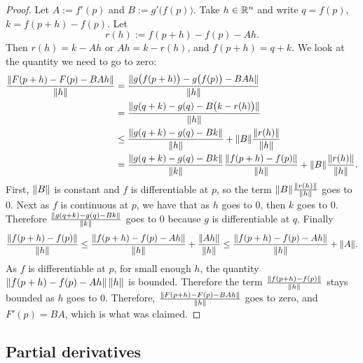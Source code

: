\begin{proof}
Let $A := f'(p)$ and $B := g'\bigl(f(p)\bigr)$.  Take $h \in {\mathbb{R}}^n$
and write $q = f(p)$, $k = f(p+h)-f(p)$.  Let
\begin{equation*}
r(h) := f(p+h)-f(p) - A h . %
\end{equation*}
Then $r(h) = k-Ah$ or $Ah = k-r(h)$, and $f(p+h) = q+k$.
We look at the quantity we need to go
to zero:
\begin{equation*}
\begin{split}
\frac{\lVert {F(p+h)-F(p) - BAh} \rVert}{\lVert {h} \rVert}
& =
\frac{\lVert {g\bigl(f(p+h)\bigr)-g\bigl(f(p)\bigr) - BAh} \rVert}{\lVert {h} \rVert}
\\
& =
\frac{\lVert {g(q+k)-g(q) - B\bigl(k-r(h)\bigr)} \rVert}{\lVert {h} \rVert}
\\
& \leq
\frac
{\lVert {g(q+k)-g(q) - Bk} \rVert}
{\lVert {h} \rVert}
+
\lVert {B} \rVert
\frac
{\lVert {r(h)} \rVert}
{\lVert {h} \rVert}
\\
& =
\frac
{\lVert {g(q+k)-g(q) - Bk} \rVert}
{\lVert {k} \rVert}
\frac
{\lVert {f(p+h)-f(p)} \rVert}
{\lVert {h} \rVert}
+
\lVert {B} \rVert
\frac
{\lVert {r(h)} \rVert}
{\lVert {h} \rVert} .
\end{split}
\end{equation*}
First, $\lVert {B} \rVert$ is constant and $f$ is differentiable at $p$,
so
the term $\lVert {B} \rVert\frac{\lVert {r(h)} \rVert}{\lVert {h} \rVert}$ goes to 0.
Next as $f$ is continuous at $p$, we have that as 
$h$ goes to 0, then $k$ goes to 0.  Therefore
$\frac
{\lVert {g(q+k)-g(q) - Bk} \rVert}
{\lVert {k} \rVert}$ goes to 0 because $g$ is differentiable at $q$.
Finally 
\begin{equation*}
\frac
{\lVert {f(p+h)-f(p)} \rVert}
{\lVert {h} \rVert}
\leq
\frac
{\lVert {f(p+h)-f(p)-Ah} \rVert}
{\lVert {h} \rVert}
+
\frac
{\lVert {Ah} \rVert}
{\lVert {h} \rVert}
\leq
\frac
{\lVert {f(p+h)-f(p)-Ah} \rVert}
{\lVert {h} \rVert}
+
\lVert {A} \rVert .
\end{equation*}
As $f$ is differentiable at $p$,
for small enough $h$, the quantity
${\lVert {f(p+h)-f(p)-Ah} \rVert} \,
{\lVert {h} \rVert}$ is bounded.  Therefore the
term
$
\frac
{\lVert {f(p+h)-f(p)} \rVert}
{\lVert {h} \rVert}
$
stays bounded as $h$ goes to 0.  Therefore, 
$\frac{\lVert {F(p+h)-F(p) - BAh} \rVert}{\lVert {h} \rVert}$ goes to zero, and
$F'(p) = BA$, which is what was claimed.
\end{proof}

\subsection{Partial derivatives}

